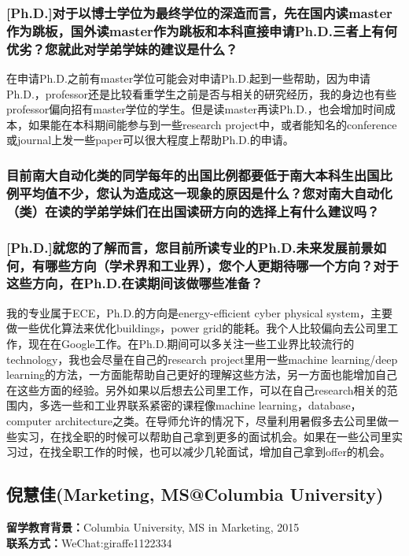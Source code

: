 \documentclass[a4paper,UTF8]{book}
\begin{document}
    \subsubsection*{[Ph.D.]对于以博士学位为最终学位的深造而言，先在国内读master作为跳板，国外读master作为跳板和本科直接申请Ph.D.三者上有何优劣？您就此对学弟学妹的建议是什么？}
    在申请Ph.D.之前有master学位可能会对申请Ph.D.起到一些帮助，因为申请Ph.D.，professor还是比较看重学生之前是否与相关的研究经历，我的身边也有些professor偏向招有master学位的学生。但是读master再读Ph.D.，也会增加时间成本，如果能在本科期间能参与到一些research project中，或者能知名的conference或journal上发一些paper可以很大程度上帮助Ph.D.的申请。

    \subsubsection*{目前南大自动化类的同学每年的出国比例都要低于南大本科生出国比例平均值不少，您认为造成这一现象的原因是什么？您对南大自动化（类）在读的学弟学妹们在出国读研方向的选择上有什么建议吗？}

    \subsubsection*{[Ph.D.]就您的了解而言，您目前所读专业的Ph.D.未来发展前景如何，有哪些方向（学术界和工业界），您个人更期待哪一个方向？对于这些方向，在Ph.D.在读期间该做哪些准备？}
    我的专业属于ECE，Ph.D.的方向是energy-efficient cyber physical system，主要做一些优化算法来优化buildings，power grid的能耗。我个人比较偏向去公司里工作，现在在Google工作。在Ph.D.期间可以多关注一些工业界比较流行的technology，我也会尽量在自己的research project里用一些machine learning/deep learning的方法，一方面能帮助自己更好的理解这些方法，另一方面也能增加自己在这些方面的经验。另外如果以后想去公司里工作，可以在自己research相关的范围内，多选一些和工业界联系紧密的课程像machine learning，database，computer architecture之类。在导师允许的情况下，尽量利用暑假多去公司里做一些实习，在找全职的时候可以帮助自己拿到更多的面试机会。如果在一些公司里实习过，在找全职工作的时候，也可以减少几轮面试，增加自己拿到offer的机会。





\clearpage
\subsection{倪慧佳(Marketing, MS@Columbia University)}
    \textbf{留学教育背景：}Columbia University, MS in Marketing, 2015\\
    \textbf{联系方式：}WeChat:giraffe1122334
\end{document}
